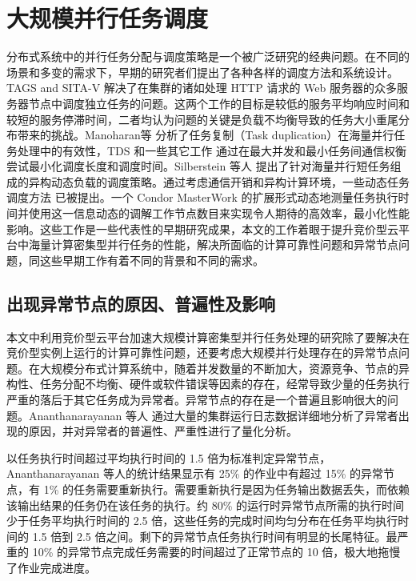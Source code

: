 \section{大规模并行任务调度}
分布式系统中的并行任务分配与调度策略是一个被广泛研究的经典问题。在不同的场景和多变的需求下，早期的研究者们提出了各种各样的调度方法和系统设计。TAGS \cite{balter} and SITA-V
\cite{Crovella:1998:TAD:277851.277942} 解决了在集群的诸如处理 HTTP 请求的 Web 服务器的众多服务器节点中调度独立任务的问题。这两个工作的目标是较低的服务平均响应时间和较短的服务停滞时间，二者均认为问题的关键是负载不均衡导致的任务大小重尾分布带来的挑战。Manoharan等 \cite{Manoharan:2001:ETD:373047.373064} 分析了任务复制（Task duplication）在海量并行任务处理中的有效性，TDS \cite{rohtua} 和一些其它工作 \cite{ahmad, Dogan:2002:LDB:850943.853100} 通过在最大并发和最小任务间通信权衡尝试最小化调度长度和调度时间。Silberstein 等人 \cite{silberstein} 提出了针对海量并行短任务组成的异构动态负载的调度策略。通过考虑通信开销和异构计算环境，一些动态任务调度方法 \cite{Ahmad:1991:SLB:126283.126284, ucar}已被提出。一个 Condor MasterWork 的扩展形式动态地测量任务执行时间并使用这一信息动态的调解工作节点数目来实现令人期待的高效率，最小化性能影响。这些工作是一些代表性的早期研究成果，本文的工作着眼于提升竞价型云平台中海量计算密集型并行任务的性能，解决所面临的计算可靠性问题和异常节点问题，同这些早期工作有着不同的背景和不同的需求。

\subsection{出现异常节点的原因、普遍性及影响}
本文中利用竞价型云平台加速大规模计算密集型并行任务处理的研究除了要解决在竞价型实例上运行的计算可靠性问题，还要考虑大规模并行处理存在的异常节点问题。在大规模分布式计算系统中，随着并发数量的不断加大，资源竞争、节点的异构性、任务分配不均衡、硬件或软件错误等因素的存在，经常导致少量的任务执行严重的落后于其它任务成为异常者。异常节点的存在是一个普遍且影响很大的问题。Ananthanarayanan 等人 \cite{Ananthanarayanan:2010:ROM:1924943.1924962} 通过大量的集群运行日志数据详细地分析了异常者出现的原因，并对异常者的普遍性、严重性进行了量化分析。

以任务执行时间超过平均执行时间的 1.5 倍为标准判定异常节点，Ananthanarayanan 等人的统计结果显示有 25\% 的作业中有超过 15\% 的异常节点，有 1\% 的任务需要重新执行。需要重新执行是因为任务输出数据丢失，而依赖该输出结果的任务仍在该任务的执行。约 80\% 的运行时异常节点所需的执行时间少于任务平均执行时间的 2.5 倍，这些任务的完成时间均匀分布在任务平均执行时间的 1.5 倍到 2.5 倍之间。剩下的异常节点任务执行时间有明显的长尾特征。最严重的 10\% 的异常节点完成任务需要的时间超过了正常节点的 10 倍，极大地拖慢了作业完成进度。

